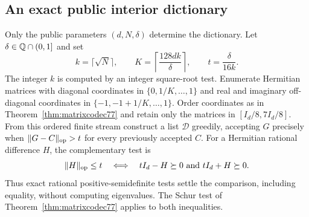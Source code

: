 \subsection{An exact public interior dictionary}
Only the public parameters $(d,N,\delta)$ determine the dictionary.
Let $\delta\in\mathbb Q\cap(0,1]$ and set
\begin{equation}\label{eq:interiorgrid79}
 k=\lceil\sqrt N\rceil,\qquad
 K=\left\lceil\frac{128dk}{\delta}\right\rceil,\qquad
 t=\frac{\delta}{16k}.
\end{equation}
The integer $k$ is computed by an integer square-root test.  Enumerate
Hermitian matrices with diagonal coordinates in
$\{0,1/K,\ldots,1\}$ and real and imaginary off-diagonal coordinates
in $\{-1,-1+1/K,\ldots,1\}$.  Order coordinates as in
Theorem~\ref{thm:matrixcodec77} and retain only the matrices in
$[I_d/8,7I_d/8]$.  From this ordered finite stream construct a list
$\mathcal D$ greedily, accepting $G$ precisely when
$\|G-C\|_{\rm op}>t$ for every previously accepted $C$.
For a Hermitian rational difference $H$, the complementary test is
\begin{equation}\label{eq:interiortest79}
 \|H\|_{\rm op}\le t
 \quad\Longleftrightarrow\quad tI_d-H\succeq0
                      \ \hbox{and}\ tI_d+H\succeq0.
\end{equation}
Thus exact rational positive-semidefinite tests settle the comparison,
including equality, without computing eigenvalues.  The Schur test
of Theorem~\ref{thm:matrixcodec77} applies to both inequalities.

